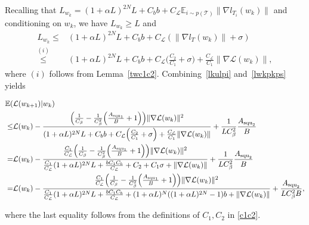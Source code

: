 \documentclass{osudissert96}
\begin{document}
	Recalling that $L_{w_k} = (1+\alpha L)^{2N}L + C_b b +  C_\mathcal{L} \mathbb{E}_{i\sim p(\mathcal{T})}\|\nabla l_{T_i}(w_k)\|$ and conditioning on $w_k$, we have  $L_{w_k}\geq L$ and 
	\begin{align}\label{lkulpi}
	L_{w_k} \leq & (1+\alpha L)^{2N}L + C_b b +  C_\mathcal{L} (\|\nabla l_{T}(w_k)\| + \sigma) \nonumber
	\\\overset{(i)}\leq&(1+\alpha L)^{2N}L + C_b b + C_\mathcal{L}\Big( \frac{C_2}{C_1} +\sigma\Big)  + \frac{C_\mathcal{L}}{C_1} \|\nabla \mathcal{L}(w_k)\|,
	\end{align}
	where $(i)$ follows from Lemma~\ref{twc1c2}. Combining~\cref{lkulpi} and~\cref{lwkpkps} yields
	\begin{small}
	\begin{align}\label{b2n8} 
	\mathbb{E}	(&\mathcal{L}(w_{k+1})  | w_k) \nonumber
	\\\leq&  \mathcal{L}(w_{k})  -\frac{\Big(  \frac{1}{C_\beta}  - \frac{1}{C_\beta^2}\Big( \frac{A_{\text{\normalfont squ}_1}}{B}+1\Big)\Big)\|\nabla \mathcal{L}(w_k)\|^2 }{(1+\alpha L)^{2N}L + C_b b + C_\mathcal{L}\Big( \frac{C_2}{C_1} +\sigma\Big)  + \frac{C_\mathcal{L}}{C_1} \|\nabla \mathcal{L}(w_k)\|} + \frac{1}{LC_\beta^2} \frac{A_{\text{\normalfont squ}_2}}{B} \nonumber
	\\ = &\mathcal{L}(w_{k})  -\frac{\frac{C_1}{C_\mathcal{L}} \Big(  \frac{1}{C_\beta}  - \frac{1}{C_\beta^2}\Big( \frac{A_{\text{\normalfont squ}_1}}{B}+1\Big)\Big)\|\nabla \mathcal{L}(w_k)\|^2 }{\frac{C_1}{C_\mathcal{L}} (1+\alpha L)^{2N}L + \frac{bC_1C_b  }{C_\mathcal{L}} +C_2 +C_1\sigma  + \|\nabla \mathcal{L}(w_k)\|} + \frac{1}{LC_\beta^2} \frac{A_{\text{\normalfont squ}_2}}{B} \nonumber
	\\= &\mathcal{L}(w_{k})  -\frac{\frac{C_1}{C_\mathcal{L}} \Big(  \frac{1}{C_\beta}  - \frac{1}{C_\beta^2}\Big( \frac{A_{\text{\normalfont squ}_1}}{B}+1\Big)\Big)\|\nabla \mathcal{L}(w_k)\|^2 }{\frac{C_1}{C_\mathcal{L}} (1+\alpha L)^{2N}L + \frac{bC_1C_b  }{C_\mathcal{L}} +(1+\alpha L)^N((1+\alpha L)^{2N}-1)b  + \|\nabla \mathcal{L}(w_k)\|} +  \frac{A_{\text{\normalfont squ}_2}}{ LC_\beta^2 B},
	\end{align}
	\end{small}
	\hspace{-0.12cm}where the last equality follows from the definitions of $C_1,C_2$ in \cref{c1c2}. 
\end{document}

